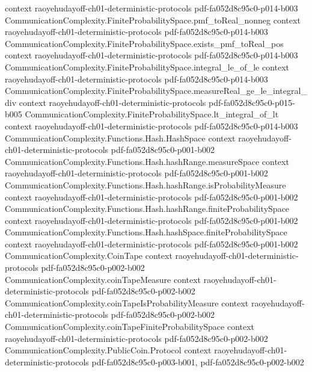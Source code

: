 \begin{theorem}
  {context}
  {raoyehudayoff-ch01-deterministic-protocols}
  {pdf-fa052d8c95c0-p014-b003}
\proofstep
  {CommunicationComplexity.FiniteProbabilitySpace.pmf_toReal_nonneg}
  {context}
  {raoyehudayoff-ch01-deterministic-protocols}
  {pdf-fa052d8c95c0-p014-b003}
\proofstep
  {CommunicationComplexity.FiniteProbabilitySpace.exists_pmf_toReal_pos}
  {context}
  {raoyehudayoff-ch01-deterministic-protocols}
  {pdf-fa052d8c95c0-p014-b003}
\proofstep
  {CommunicationComplexity.FiniteProbabilitySpace.integral_le_of_le}
  {context}
  {raoyehudayoff-ch01-deterministic-protocols}
  {pdf-fa052d8c95c0-p014-b003}
\proofstep
  {CommunicationComplexity.FiniteProbabilitySpace.measureReal_ge_le_integral_div}
  {context}
  {raoyehudayoff-ch01-deterministic-protocols}
  {pdf-fa052d8c95c0-p015-b005}
\proofstep
  {CommunicationComplexity.FiniteProbabilitySpace.lt_integral_of_lt}
  {context}
  {raoyehudayoff-ch01-deterministic-protocols}
  {pdf-fa052d8c95c0-p014-b003}
\proofstep
  {CommunicationComplexity.Functions.Hash.HashSpace}
  {context}
  {raoyehudayoff-ch01-deterministic-protocols}
  {pdf-fa052d8c95c0-p001-b002}
\proofstep
  {CommunicationComplexity.Functions.Hash.hashRange.measureSpace}
  {context}
  {raoyehudayoff-ch01-deterministic-protocols}
  {pdf-fa052d8c95c0-p001-b002}
\proofstep
  {CommunicationComplexity.Functions.Hash.hashRange.isProbabilityMeasure}
  {context}
  {raoyehudayoff-ch01-deterministic-protocols}
  {pdf-fa052d8c95c0-p001-b002}
\proofstep
  {CommunicationComplexity.Functions.Hash.hashRange.finiteProbabilitySpace}
  {context}
  {raoyehudayoff-ch01-deterministic-protocols}
  {pdf-fa052d8c95c0-p001-b002}
\proofstep
  {CommunicationComplexity.Functions.Hash.hashSpace.finiteProbabilitySpace}
  {context}
  {raoyehudayoff-ch01-deterministic-protocols}
  {pdf-fa052d8c95c0-p001-b002}
\proofstep
  {CommunicationComplexity.CoinTape}
  {context}
  {raoyehudayoff-ch01-deterministic-protocols}
  {pdf-fa052d8c95c0-p002-b002}
\proofstep
  {CommunicationComplexity.coinTapeMeasure}
  {context}
  {raoyehudayoff-ch01-deterministic-protocols}
  {pdf-fa052d8c95c0-p002-b002}
\proofstep
  {CommunicationComplexity.coinTapeIsProbabilityMeasure}
  {context}
  {raoyehudayoff-ch01-deterministic-protocols}
  {pdf-fa052d8c95c0-p002-b002}
\proofstep
  {CommunicationComplexity.coinTapeFiniteProbabilitySpace}
  {context}
  {raoyehudayoff-ch01-deterministic-protocols}
  {pdf-fa052d8c95c0-p002-b002}
\proofstep
  {CommunicationComplexity.PublicCoin.Protocol}
  {context}
  {raoyehudayoff-ch01-deterministic-protocols}
  {pdf-fa052d8c95c0-p003-b001,
    pdf-fa052d8c95c0-p002-b002}
\proofstep

\end{theorem}
